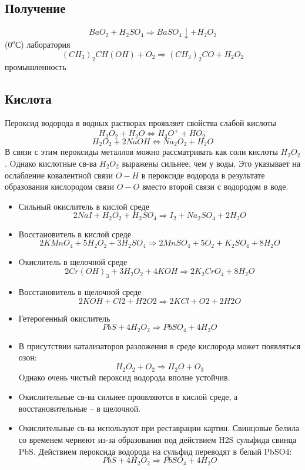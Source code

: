 \documentclass[11pt]{article}
\begin{document}
\subsection{Получение}
$$BaO_2 + H_2SO_4 \Rightarrow BaSO_4 \downarrow  + H_2O_2$$ ($0^oС$) лаборатория
$$(CH_3)_2CH(OH) + O_2 \Rightarrow (CH_3)_2CO + H_2O_2$$ промышленность

\subsection{Кислота}
Пероксид водорода в водных растворах проявляет свойства слабой кислоты
$$H_2O_2 + H_2O \Leftrightarrow H_3O^+ + HO_2^-$$
$$H_2O_2 + 2NaOH \Leftrightarrow Na _2O_2 + H_2O$$
В связи с этим пероксиды металлов можно рассматривать как соли кислоты $H_2O_2$. Oднако
кислотные св-ва $H_2O_2$ выражены сильнее, чем у воды. Это указывает на ослабление
ковалентной связи $O-H$ в пероксиде водорода в результате образования кислородом связи
$O-O$ вместо второй связи с водородом в воде.
\begin{itemize}
\item Сильный окислитель в кислой среде
$$2NaI + H_2O_2+ H_2SO_4 \Rightarrow I_2 + Na_2SO_4 + 2H_2O$$

\item Восстановитель в кислой среде
$$2KMnO_4 + 5H_2O_2 + 3H_2SO_4 \Rightarrow 2MnSO_4 + 5O_2 + K_2SO_4 + 8H_2O$$

\item Oкислитель в щелочной среде
$$2Cr(OH)_3 + 3H_2O_2 + 4KOH \Rightarrow 2K_2CrO_4 + 8H_2O$$
\item Восстановитель в щелочной среде
$$2KOH + Cl2 + H2O2 \Rightarrow 2KCl + O2 + 2H2O$$

\item Гетерогенный окислитель
$$PbS  + 4H_2O_2 \Rightarrow PbSO_4 + 4H_2O$$

\item В присутствии катализаторов разложения в среде кислорода может появляться озон:
$$H_2O_2 + O_2 \Rightarrow H_2O + O_3$$
Oднако очень чистый пероксид водорода вполне устойчив.

\item Oкислительные св-ва сильнее проявляются в кислой среде, а восстановительные – в
щелочной.

\item Oкислительные св-ва используют при реставрации картин. Свинцовые белила со временем
чернеют из-за образования под действием H2S сульфида свинца PbS. Действием пероксида
водорода на сульфид переводят в белый PbSO4:
$$PbS + 4H_2O_2 \Rightarrow PbSO_4 + 4H_2O$$
\end{itemize}
\end{document}
